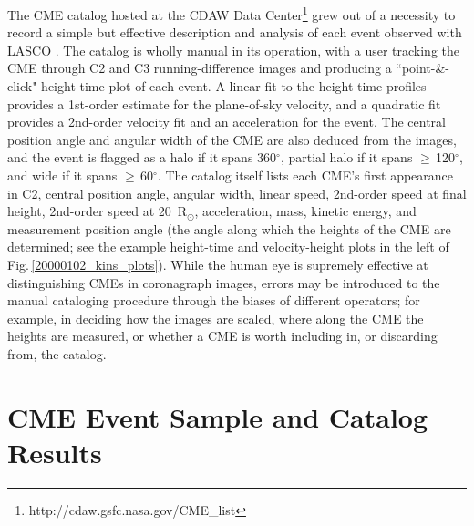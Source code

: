 \documentclass[referee,a4paper,12pt,traditabstract]{swsc}
\begin{document}
\begin{linenumbers}
The CME catalog hosted at the CDAW Data Center\footnote{http://cdaw.gsfc.nasa.gov/CME\_list}  grew out of a necessity to record a simple but effective description and analysis of each event observed with LASCO \citep{2009EM&P..104..295G}. The catalog is wholly manual in its operation, with a user tracking the CME through C2 and C3 running-difference images and producing a ``point-\&-click" height-time plot of each event. A linear fit to the height-time profiles provides a 1st-order estimate for the plane-of-sky velocity, and a quadratic fit provides a 2nd-order velocity fit and an acceleration for the event. The central position angle and angular width of the CME are also deduced from the images, and the event is flagged as a halo if it spans 360$^{\circ}$, partial halo if it spans $\ge$\,120$^{\circ}$, and wide if it spans $\ge$\,60$^{\circ}$. The catalog itself lists each CME's first appearance in C2, central position angle, angular width, linear speed, 2nd-order speed at final height, 2nd-order speed at 20~R$_{\odot}$, acceleration, mass, kinetic energy, and measurement position angle (the angle along which the heights of the CME are determined; see the example height-time and velocity-height plots in the left of Fig.\,\ref{20000102_kins_plots}). While the human eye is supremely effective at distinguishing CMEs in coronagraph images, errors may be introduced to the manual cataloging procedure through the biases of different operators; for example, in deciding how the images are scaled, where along the CME the heights are measured, or whether a CME is worth including in, or discarding from, the catalog.


\section{CME Event Sample and Catalog Results}
\label{sect_events}


\end{linenumbers}
\end{document}

